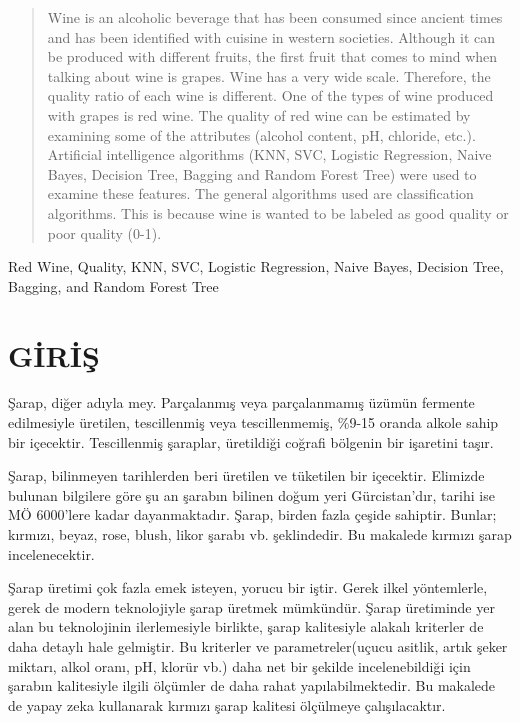 \documentclass[conference]{IEEEtran}
\begin{document}
\begin{abstract}
Wine is an alcoholic beverage that has been consumed since ancient times and has been identified with cuisine in western societies. Although it can be produced with different fruits, the first fruit that comes to mind when talking about wine is grapes. Wine has a very wide scale. Therefore, the quality ratio of each wine is different. One of the types of wine produced with grapes is red wine. The quality of red wine can be estimated by examining some of the attributes (alcohol content, pH, chloride, etc.). Artificial intelligence algorithms (KNN, SVC, Logistic Regression, Naive Bayes, Decision Tree, Bagging and Random Forest Tree) were used to examine these features. The general algorithms used are classification algorithms. This is because wine is wanted to be labeled as good quality or poor quality (0-1).
\end{abstract}

\begin{IEEEkeywords}
Red Wine, Quality, KNN, SVC, Logistic Regression, Naive Bayes, Decision Tree, Bagging, and Random Forest Tree
\end{IEEEkeywords}
\pagebreak
\section{\textbf{GİRİŞ}}
\quad Şarap, diğer adıyla mey. Parçalanmış veya parçalanmamış üzümün fermente edilmesiyle\cite{1} üretilen, tescillenmiş veya tescillenmemiş, \%9-15 oranda alkole sahip\cite{2} bir içecektir. Tescillenmiş şaraplar, üretildiği coğrafi bölgenin bir işaretini taşır\cite{3}.

\quad Şarap, bilinmeyen tarihlerden beri üretilen ve tüketilen bir içecektir. Elimizde bulunan bilgilere göre şu an şarabın bilinen doğum yeri Gürcistan’dır, tarihi ise MÖ 6000’lere kadar dayanmaktadır\cite{2}. Şarap, birden fazla çeşide sahiptir. Bunlar; kırmızı, beyaz, rose, blush, likor şarabı vb. şeklindedir\cite{1}. Bu makalede kırmızı şarap incelenecektir.

\quad Şarap üretimi çok fazla emek isteyen, yorucu bir iştir. Gerek ilkel yöntemlerle, gerek de modern teknolojiyle şarap üretmek mümkündür. Şarap üretiminde yer alan bu teknolojinin ilerlemesiyle birlikte, şarap kalitesiyle alakalı kriterler de daha detaylı hale gelmiştir\cite{1}. Bu kriterler ve parametreler(uçucu asitlik, artık şeker miktarı, alkol oranı, pH, klorür vb.) daha net bir şekilde incelenebildiği için şarabın kalitesiyle ilgili ölçümler de daha rahat yapılabilmektedir. Bu makalede de yapay zeka kullanarak kırmızı şarap kalitesi ölçülmeye çalışılacaktır.
\end{document}
